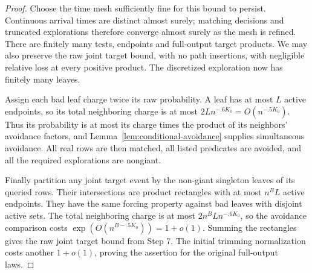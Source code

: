 \begin{proof}
Choose the time mesh sufficiently fine for this bound to persist.
Continuous arrival times are distinct almost surely; matching decisions
and truncated explorations therefore converge almost surely as the
mesh is refined. There are finitely many tests, endpoints and full-output
target products. We may also preserve the raw joint target bound, with
no path insertions, with negligible relative loss at every positive
product. The discretized exploration now has finitely many leaves.

Assign each bad leaf charge twice its raw probability. A leaf has at
most \(L\) active endpoints, so its total neighboring charge is at most
\(2L n^{-.6K_0}=O(n^{-.5K_0})\). Thus its probability is at most its
charge times the product of its neighbors' avoidance factors, and
Lemma~\ref{lem:conditional-avoidance} supplies simultaneous avoidance.
All real rows are then matched, all listed predicates are avoided, and
all the required explorations are nongiant.

Finally partition any joint target event by the non-giant singleton
leaves of its queried rows. Their intersections are product rectangles
with at most \(n^B L\) active endpoints. They have the same forcing
property against bad leaves with disjoint active sets. The total
neighboring charge is at most \(2n^B L n^{-.6K_0}\), so the avoidance
comparison costs
\(\exp(O(n^{B-.5K_0}))=1+o(1)\). Summing the rectangles gives the raw
joint target bound from Step 7. The initial trimming normalization costs
another \(1+o(1)\), proving the assertion for the original full-output
laws.
\end{proof}
